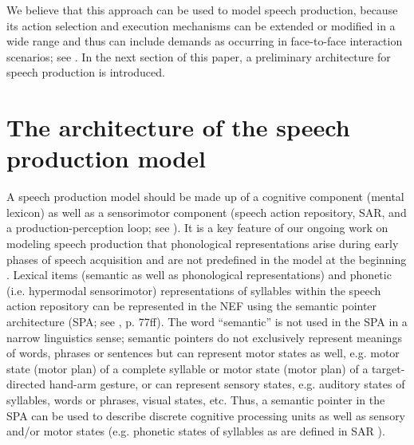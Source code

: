 \documentclass[conference]{IEEEtran}
\begin{document}
We believe that this approach can be used to model speech
production, because its action selection and
execution mechanisms can be extended or modified in a wide range
and thus can include demands as occurring in face-to-face interaction
scenarios; see \cite{kroger2011}. In the next section of
this paper, a preliminary architecture for speech production is
introduced.

\section{The architecture of the speech production
  model}

A speech production model should be made up of a cognitive component
(mental lexicon) as well as a sensorimotor component (speech action
repository, SAR, and a production-perception loop; see
\cite{kroger2009,kroger2014,kroger2012,kroger2011a,eckers2013,eckers2013a,kroger2010}).
It is a key feature of our ongoing work on modeling speech production
that phonological representations arise during
early phases of speech acquisition and are not predefined in the model
at the beginning
\cite{kroger2009,kroger2014,kroger2011}. Lexical items (semantic as
well as phonological representations) and phonetic (i.e.
hypermodal sensorimotor) representations of syllables within the
speech action repository
\cite{kroger2012,kroger2011a,eckers2013,eckers2013a,kroger2010} can be
represented in the NEF using the semantic pointer architecture (SPA; see
\cite{eliasmith2013}, p. 77ff). The word ``semantic'' is not used in
the SPA in a narrow linguistics sense; semantic pointers do not
exclusively represent meanings of words, phrases or sentences
but can represent motor states as well, e.g. motor state (motor plan)
of a complete syllable or motor state (motor plan) of a
target-directed hand-arm gesture, or can represent sensory states,
e.g. auditory states of syllables, words or phrases, visual states,
etc. Thus, a semantic pointer in the SPA can be used to describe
discrete cognitive processing units as well as sensory and/or motor
states (e.g. phonetic states of syllables as are defined in SAR
\cite{kroger2012,kroger2011a,eckers2013,eckers2013a,kroger2010}).
\end{document}
